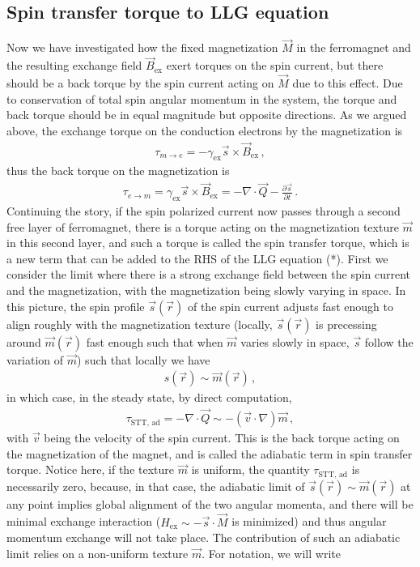 \documentclass[11pt, onesided]{book}
\theoremstyle{break}
\theoremstyle{break}
\newcommand{\pd}{\partial}
\begin{document}
\subsection{Spin transfer torque to LLG equation}
Now we have investigated how the fixed magnetization $\vec{M}$ in the ferromagnet and the resulting exchange field $\vec{B}_{\text{ex}}$ exert torques on the spin current, but there should be a back torque by the spin current acting on $\vec{M}$ due to this effect. Due to conservation of total spin angular momentum in the system, the torque and back torque should be in equal magnitude but opposite directions. As we argued above, the exchange torque on the conduction electrons by the magnetization is 
\begin{align*}
\tau_{m \to e} = -\gamma_{\text{ex}}\vec{s}\times \vec{B}_{\text{ex}}\,,
\end{align*}
thus the back torque on the magnetization is 
\begin{align*}
\tau_{e\to m} = \gamma_{\text{ex}} \vec{s}\times \vec{B}_{\text{ex}} = -\nabla \cdot \vec{Q} - \frac{\pd \vec{s}}{\pd t}\,.
\end{align*}
Continuing the story, if the spin polarized current now passes through a second free layer of ferromagnet, there is a torque acting on the magnetization texture $\vec{m}$ in this second layer, and such a torque is called the spin transfer torque, which is a new term that can be added to the RHS of the LLG equation (*). First we consider the limit where there is a strong exchange field between the spin current and the magnetization, with the magnetization being slowly varying in space. In this picture, the spin profile $\vec{s}(\vec{r}) $ of the spin current adjusts fast enough to align roughly with the magnetization texture (locally, $\vec{s}(\vec{r})$ is precessing around $\vec{m}(\vec{r})$ fast enough such that when $\vec{m}$ varies slowly in space, $\vec{s}$ follow the variation of $\vec{m}$) such that locally we have 
\begin{align*}
s(\vec{r}) \sim \vec{m}(\vec{r})\,,
\end{align*}
in which case, in the steady state, by direct computation,
\begin{align*}
\tau_{\text{STT,\ ad}}= - \nabla \cdot \vec{Q} \sim -(\vec{v}\cdot \nabla) \vec{m}\,,
\end{align*}
with $\vec{v}$ being the velocity of the spin current. This is the back torque acting on the magnetization of the magnet, and is called the adiabatic term in spin transfer torque. Notice here, if the texture $\vec{m}$ is uniform, the quantity $\tau_{\text{STT,\ ad}}$ is necessarily zero, because, in that case, the adiabatic limit of $\vec{s}(\vec{r}) \sim \vec{m}(\vec{r})$ at any point implies global alignment of the two angular momenta, and there will be minimal exchange interaction ($H_{\text{ex}} \sim -\vec{s} \cdot \vec{M}$ is minimized) and thus angular momentum exchange will not take place. The contribution of such an adiabatic limit relies on a non-uniform texture $\vec{m}$. For notation, we will write
\end{document}
